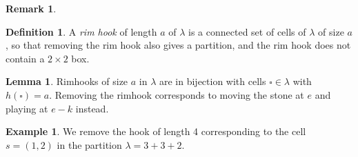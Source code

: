 \documentclass{amsart}[12pt]
\theoremstyle{definition}
\newtheorem{lemma}[dummy]{Lemma}
\newtheorem{example}[dummy]{Example}
\newtheorem{definition}[dummy]{Definition}
\newtheorem{remark}[dummy]{Remark}
\begin{document}
\begin{remark}
\begin{center}

\end{center}



\begin{definition} \label{def:rimhook} A \emph{rim hook} of length $a$ of $\lambda$ is a connected set of cells of $\lambda$ of size $a$, so that removing the rim hook also gives a partition, and the rim hook does not contain a $2\times 2$ box.  
\end{definition}
  
\begin{lemma} \label{lem:rimhooks}
Rimhooks of size $a$ in $\lambda$ are in bijection with cells $\square\in\lambda$ with $h(\square)=a$.  Removing the rimhook corresponds to moving the stone at $e$ and playing at $e-k$ instead.
\end{lemma}

\begin{example}
We remove the hook of length 4 corresponding to the cell $s=(1,2)$ in the partition $\lambda=3+3+2$.



\end{example}
\end{remark}
\end{document}
